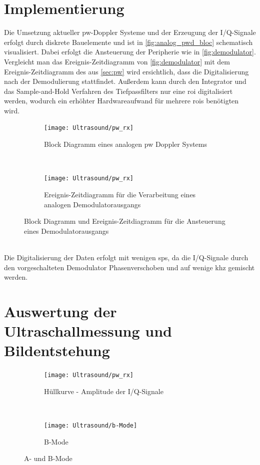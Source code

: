 \section{Implementierung}
Die Umsetzung aktueller \ac{pw}-Doppler Systeme und der Erzeugung der I/Q-Signale erfolgt durch diskrete Bauelemente und ist in \autoref{fig:analog_pwd_bloc} schematisch visualisiert. Dabei erfolgt die Ansteuerung der Peripherie wie in \autoref{fig:demodulator}. Vergleicht man das Ereignis-Zeitdiagramm von \autoref{fig:demodulator} mit dem Ereignis-Zeitdiagramm des  aus \autoref{sec:pw} wird ersichtlich, dass die Digitalisierung nach der Demodulierung stattfindet. Außerdem kann durch den Integrator und das Sample-and-Hold Verfahren des Tiefpassfilters nur eine \ac{roi} digitalisiert werden, wodurch ein erhöhter Hardwareaufwand für mehrere \ac{roi}s benötigten wird.
\begin{figure}[h!]
  \centering
  \begin{subfigure}[b]{1\textwidth}
	\centering
  \texttt{[image: Ultrasound/pw\_rx]} 
  \caption{Block Diagramm eines analogen \ac{pw} Doppler Systems}
  \label{fig:analog_pwd_bloc}
  \end{subfigure}
  ~
  \begin{subfigure}[b]{1\textwidth}
	\centering
	\texttt{[image: Ultrasound/pw\_rx]} 
	\caption{Ereignis-Zeitdiagramm für die Verarbeitung eines analogen Demodulatorausgangs}
  \label{fig:demodulator}
  \end{subfigure}
  \caption{Block Diagramm und Ereignis-Zeitdiagramm für die Ansteuerung eines Demodulatorausgangs}
  \label{fig:analog_pwd}
\end{figure}\\
Die Digitalisierung der Daten erfolgt mit wenigen \ac{sps}, da die I/Q-Signale durch den vorgeschalteten Demodulator Phasenverschoben und auf wenige \ac{khz} gemischt werden.
\section{Auswertung der Ultraschallmessung und Bildentstehung}
\begin{figure}[h!]
  \centering
  \begin{subfigure}[b]{0.7\textwidth}
  \texttt{[image: Ultrasound/pw\_rx]} 
  \caption{Hüllkurve - Amplitude der I/Q-Signale}
  \label{fig:a_mode}
\end{subfigure}
~
\begin{subfigure}[b]{0.2\textwidth}
  \centering
  \texttt{[image: Ultrasound/b-Mode]}  
  	\caption{B-Mode}
  \label{fig:b_mode}
  \end{subfigure}
	\caption{A- und B-Mode}
\end{figure}
